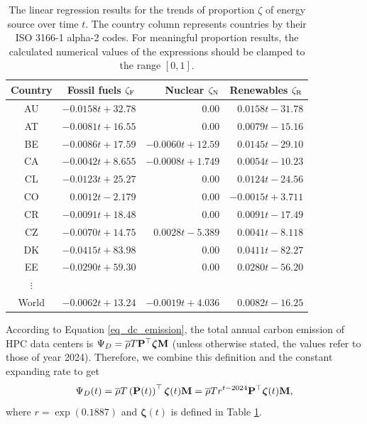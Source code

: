 \documentclass[12pt]{article}
\begin{document}
\begin{table}[!t]
	\centering
	\caption{The linear regression results for the trends of proportion $\zeta$ of energy source over time $t$. The country column represents countries by their ISO 3166-1 alpha-2 codes. For meaningful proportion results, the calculated numerical values of the expressions should be clamped to the range $\left[0, 1\right]$.}
	\label{table_mix_trend_eqs}
	\small
	\begin{tabular}{c|r|r|r}
		\hline
		\textbf{Country} & \textbf{Fossil fuels} $\zeta_{\rm F}$
		& \textbf{Nuclear} $\zeta_{\rm N}$ & \textbf{Renewables} $\zeta_{\rm R}$ \\
		\hline
		AU & $-0.0158t + 32.78$ & 0.00 & $0.0158t - 31.78$ \\
		AT & $-0.0081t + 16.55$ & 0.00 & $0.0079t - 15.16$ \\
		BE & $-0.0086t + 17.59$ & $-0.0060t + 12.59$ & $0.0145t - 29.10$ \\
		CA & $-0.0042t + 8.655$ & $-0.0008t + 1.749$ & $0.0054t - 10.23$ \\
		CL & $-0.0123t + 25.27$ & 0.00 & $0.0124t - 24.56$ \\
		CO & $0.0012t - 2.179$ & 0.00 & $-0.0015t + 3.711$ \\
		CR & $-0.0091t + 18.48$ & 0.00 & $0.0091t - 17.49$ \\
		CZ & $-0.0070t + 14.75$ & $0.0028t - 5.389$ & $0.0041t - 8.118$ \\
		DK & $-0.0415t + 83.98$ & 0.00 & $0.0411t - 82.27$ \\
		EE & $-0.0290t + 59.30$ & 0.00 & $0.0280t - 56.20$ \\
		$\vdots$ &&& \\
		World & $-0.0062t + 13.24$ & $-0.0019t + 4.036$ & $0.0082t - 16.25$ \\
		\hline
	\end{tabular}
\end{table}

According to Equation \ref{eq_dc_emission}, the total annual carbon emission of HPC data centers is $\Psi_D = \overline{\rho} T \vb{P}^\top \boldsymbol{\zeta} \vb{M}$ (unless otherwise stated, the values refer to those of year 2024). Therefore, we combine this definition and the constant expanding rate to get
\begin{equation}
	\Psi_D (t) = \overline{\rho} T \left(\vb{P}(t)\right)^\top \boldsymbol{\zeta}(t) \vb{M}
	= \overline{\rho} T r^{t - 2024} \vb{P}^\top \boldsymbol{\zeta}(t) \vb{M},
\end{equation}
where $r = \exp \left(0.1887\right)$ and $\boldsymbol{\zeta}(t)$ is defined in Table \ref{table_mix_trend_eqs}.
\end{document}
